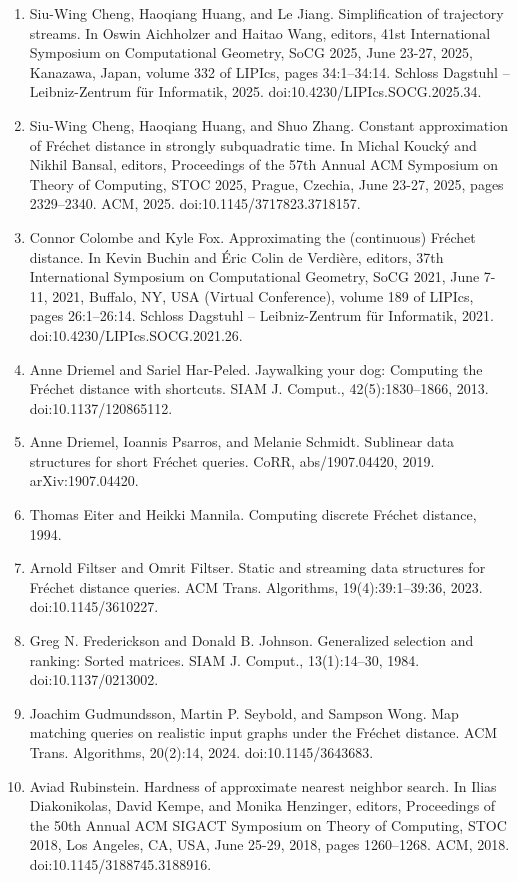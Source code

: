 \documentclass[10pt,a4paper]{article}
\begin{document}
\begin{enumerate}
\item[]  [16]  Siu-Wing Cheng, Haoqiang Huang, and Le Jiang.  Simplification of trajectory streams.  In Oswin Aichholzer and Haitao Wang, editors, 41st International Symposium on Computational Geometry, SoCG 2025, June 23-27, 2025, Kanazawa, Japan, volume 332 of LIPIcs, pages 34:1–34:14. Schloss Dagstuhl – Leibniz-Zentrum für Informatik, 2025.  doi:10.4230/LIPIcs.SOCG.2025.34.  
\item[]  [17]  Siu-Wing Cheng, Haoqiang Huang, and Shuo Zhang.  Constant approximation of Fréchet distance in strongly subquadratic time.  In Michal Koucký and Nikhil Bansal, editors, Proceedings of the 57th Annual ACM Symposium on Theory of Computing, STOC 2025, Prague, Czechia, June 23-27, 2025, pages 2329–2340. ACM, 2025.  doi:10.1145/3717823.3718157.  
\item[]  [18]  Connor Colombe and Kyle Fox.  Approximating the (continuous) Fréchet distance.  In Kevin Buchin and Éric Colin de Verdière, editors, 37th International Symposium on Computational Geometry, SoCG 2021, June 7-11, 2021, Buffalo, NY, USA (Virtual Conference), volume 189 of LIPIcs, pages 26:1–26:14. Schloss Dagstuhl – Leibniz-Zentrum für Informatik, 2021.  doi:10.4230/LIPIcs.SOCG.2021.26.  
\item[]  [19]  Anne Driemel and Sariel Har-Peled.  Jaywalking your dog: Computing the Fréchet distance with shortcuts.  SIAM J. Comput., 42(5):1830–1866, 2013.  doi:10.1137/120865112.  
\item[]  [20]  Anne Driemel, Ioannis Psarros, and Melanie Schmidt.  Sublinear data structures for short Fréchet queries.  CoRR, abs/1907.04420, 2019.  arXiv:1907.04420.  
\item[]  [21]  Thomas Eiter and Heikki Mannila.  Computing discrete Fréchet distance, 1994.  
\item[]  [22]  Arnold Filtser and Omrit Filtser.  Static and streaming data structures for Fréchet distance queries.  ACM Trans. Algorithms, 19(4):39:1–39:36, 2023.  doi:10.1145/3610227.  
\item[]  [23]  Greg N. Frederickson and Donald B. Johnson.  Generalized selection and ranking: Sorted matrices.  SIAM J. Comput., 13(1):14–30, 1984.  doi:10.1137/0213002.  
\item[]  [24]  Joachim Gudmundsson, Martin P. Seybold, and Sampson Wong.  Map matching queries on realistic input graphs under the Fréchet distance.  ACM Trans. Algorithms, 20(2):14, 2024.  doi:10.1145/3643683.  
\item[]  [25]  Aviad Rubinstein.  Hardness of approximate nearest neighbor search.  In Ilias Diakonikolas, David Kempe, and Monika Henzinger, editors, Proceedings of the 50th Annual ACM SIGACT Symposium on Theory of Computing, STOC 2018, Los Angeles, CA, USA, June 25-29, 2018, pages 1260–1268. ACM, 2018.  doi:10.1145/3188745.3188916.  

\end{enumerate}
\end{document}
